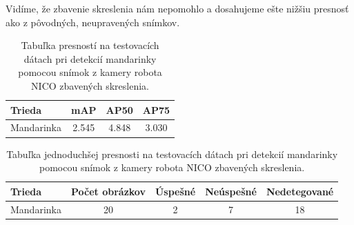 Vidíme, že zbavenie skreslenia nám nepomohlo a dosahujeme ešte nižšiu presnosť ako z pôvodných, neupravených snímkov. 

\begin{table}[H]
\begin{tabular}{|l|c|c|c|}
\hline
\textbf{Trieda} & \textbf{mAP} & \textbf{AP50} & \textbf{AP75} \\
\hline
Mandarinka & 2.545 & 4.848 & 3.030 \\
\hline
\end{tabular}
\centering
\caption{Tabuľka presností na testovacích dátach pri detekcií mandarinky pomocou snímok z kamery robota NICO zbavených skreslenia.}
\label{tab:table701}
\end{table}

\begin{table}[H]
\begin{tabular}{|l|c|c|c|c|}
\hline
\textbf{Trieda} & \textbf{Počet obrázkov} & \textbf{Úspešné} & \textbf{Neúspešné} &  \textbf{Nedetegované}\\
\hline
Mandarinka & 20 & 2 & 7 & 18\\
\hline
\end{tabular}
\centering
\caption{Tabuľka jednoduchšej presnosti na testovacích dátach pri detekcií mandarinky pomocou snímok z kamery robota NICO zbavených skreslenia.}
\label{tab:table703}
\end{table}
